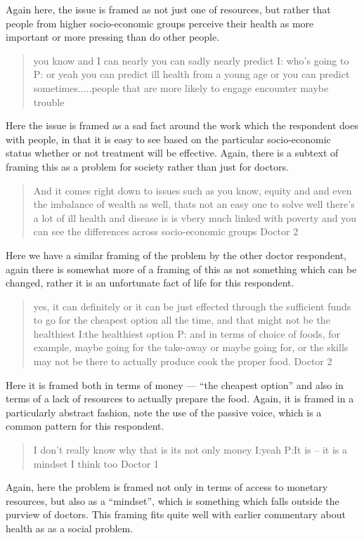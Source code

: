 Again here, the issue is framed as not just one of resources, but rather that people from higher socio-economic groups perceive their health as more important or more pressing than do other people. 


\begin{quotation}
  you know and I can nearly you can sadly nearly predict 
I: who's going to
P: or yeah you can predict ill health from a young age or you can predict sometimes.....people that are more likely to engage encounter maybe trouble

\end{quotation}

Here the issue is framed as a sad fact around the work which the respondent does with people, in that it is easy to see based on the particular socio-economic status whether or not treatment will be effective. Again, there is a subtext of framing this as a problem for society rather than just for doctors. 

\begin{quotation}
  And it comes right down to issues such as you know, equity and and even the imbalance of wealth as well, thats not an easy one to solve well there's a lot of ill health and disease is is vbery much linked with poverty and you can see the differences across socio-economic groups 
Doctor 2
\end{quotation}

Here we have a similar framing of the problem by the other doctor respondent, again there is somewhat more of a framing of this as not something which can be changed, rather it is an unfortunate fact of life for this respondent. 

\begin{quotation}
  yes, it can definitely or it can be just effected through the sufficient funds to go for the cheapest option all the time, and that might not be the healthiest
I:the healthiest option
P: and in terms of choice of foods, for example, maybe going for the take-away or maybe going for, or the skills may not be there to actually produce cook the proper food.
Doctor 2
\end{quotation}

Here it is framed both in terms of money --- ``the cheapest option'' and also in terms of a lack of resources to actually prepare the food. Again, it is framed in a particularly abstract fashion, note the use of the passive voice, which is a common pattern for this respondent. 

\begin{quotation}
   I don't really know why that is its not only money 
I:yeah
P:It is – it is a mindset I think too
Doctor 1
\end{quotation}
 Again, here the problem is framed not only in terms of access to monetary resources, but also as a ``mindset'', which is something which falls outside the purview of doctors. This framing fits quite well with earlier commentary about health as as a social problem. 

